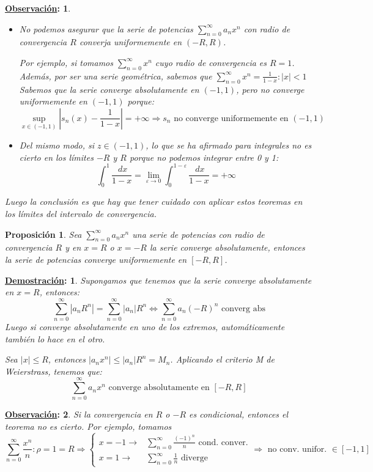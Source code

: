 \documentclass[10pt,a4paper,openright]{book}
\theoremstyle{break}
\newtheorem*{prop}{Proposición}
\newtheorem*{demo}{\underline{Demostración}:}
\newtheorem*{obs}{\underline{Observación}:}
\newcommand{\dif}[1]{\ d#1}
\begin{document}
\begin{obs}
\begin{itemize}
\item No podemos asegurar que la serie de potencias $\sum_{n= 0}^{\infty} a_n x^n $ con radio de convergencia $R$ converja uniformemente en $(-R,R)$.

Por ejemplo, si tomamos $\sum_{n= 0 }^{\infty} x^n$ cuyo radio de convergencia es $R = 1$. Además, por ser una serie geométrica, sabemos que $\sum_{n= 0 }^{\infty} x^n = \frac{1}{1-x} : |x| < 1$
Sabemos que la serie converge absolutamente en $(-1,1)$, pero no converge uniformemente en $(-1,1)$ porque:
$$\underset{x \in (-1,1)}{\sup} |s_n (x) - \frac{1}{1-x}| = + \infty \Rightarrow s_n  \mbox{ no converge uniformemente en }(-1,1)$$

\item Del mismo modo, si $z \in (-1,1)$, lo que se ha afirmado para integrales no es cierto en los límites $-R$ y $R$ porque no podemos integrar entre 0 y 1:
$$\int_{0}^{1} \frac{\dif{x}}{1-x} = \lim_{\varepsilon \to 0}  \int_{0}^{1-\varepsilon} \frac{\dif{x}}{1-x} = + \infty$$
\end{itemize}
Luego la conclusión es que hay que tener cuidado con aplicar estos teoremas en los límites del intervalo de convergencia.
\end{obs}

\begin{prop}
Sea $\sum_{n= 0}^{\infty} a_n x^n $ una serie de potencias con radio de convergencia $R$ y en $x = R$ o $x = -R$ la serie converge absolutamente, entonces la serie de potencias converge uniformemente en $[-R, R]$.
\end{prop}
\begin{demo}
Supongamos que tenemos que la serie converge absolutamente en $x = R$, entonces:
$$\sum_{n=0}^{\infty} |a_n R^n|= \sum_{n=0}^{\infty} |a_n| R^n \Leftrightarrow \sum_{n= 0}^{\infty} a_n(-R)^n \mbox{ converg abs}$$
Luego si converge absolutamente en uno de los extremos, automáticamente también lo hace en el otro.

Sea $|x| \leq R$, entonces $|a_n x^n| \leq |a_n| R^n = M_n$. Aplicando el criterio M de Weierstrass, tenemos que:
$$\sum_{n=0}^{\infty} a_n x^n \mbox{ converge absolutamente en } [-R,R]$$
\end{demo}

\begin{obs}
Si la convergencia en $R$ o $-R$ es condicional, entonces el teorema no es cierto. Por ejemplo, tomamos
$$\sum_{n= 0 }^{\infty} \frac{x^n}{n} : \rho = 1 = R \Rightarrow \begin{cases} x=-1 \rightarrow & \sum_{n=0}^{\infty} \frac{(-1)^n}{n} \mbox{ cond. conver.} \\ x=1 \rightarrow & \sum_{n=0}^{\infty} \frac{1}{n} \mbox{ diverge}\end{cases}\Rightarrow \mbox{ no conv. unifor. } \in [-1,1]$$
\end{obs}
\end{document}
